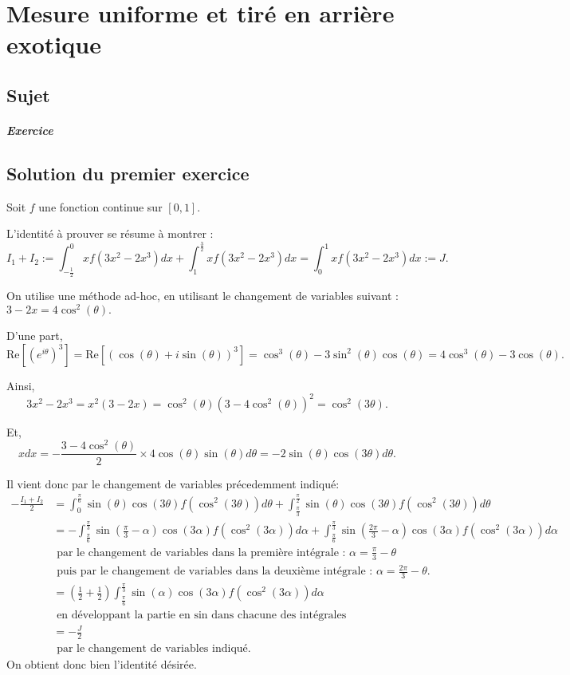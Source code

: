 \chapter{Mesure uniforme et tiré en arrière exotique}

\section{Sujet}

\paragraph{Exercice }

\section{Solution du premier exercice}

Soit $f$ une fonction continue sur $[0,1].$

L'identité à prouver se résume à montrer : $$I_{1}+I_{2}:=\int_{-\frac{1}{2}}^{0}xf(3x^{2}-2x^{3})dx+\int_{1}^{\frac{3}{2}}xf(3x^{2}-2x^{3})dx=\int_{0}^{1}xf(3x^{2}-2x^{3})dx:=J.$$

On utilise une méthode ad-hoc, en utilisant le changement de variables suivant : $3-2x=4\cos^{2}(\theta).$

D'une part, $$\mbox{Re}[(e^{i\theta})^{3}]=\mbox{Re}[\left(\cos(\theta)+i\sin(\theta)\right)^{3}]=\cos^{3}(\theta)-3\sin^{2}(\theta)\cos(\theta)=4\cos^{3}(\theta)-3\cos(\theta).$$

Ainsi, $$3x^{2}-2x^{3}=x^{2}(3-2x)=\cos^{2}(\theta)\left(3-4\cos^{2}(\theta)\right)^{2}=\cos^{2}(3\theta).$$

Et, $$xdx=-\frac{3-4\cos^{2}(\theta)}{2}\times 4\cos(\theta)\sin(\theta)d\theta=-2\sin(\theta)\cos(3\theta)d\theta.$$

Il vient donc par le changement de variables précedemment indiqué:
\begin{align*}
-\frac{I_{1}+I_{2}}{2} & = \int_{0}^{\frac{\pi}{6}}\sin(\theta)\cos(3\theta)f(\cos^{2}(3\theta))d\theta+\int_{\frac{\pi}{3}}^{\frac{\pi}{2}}\sin(\theta)\cos(3\theta)f(\cos^{2}(3\theta))d\theta\\
& =-\int_{\frac{\pi}{6}}^{\frac{\pi}{3}}\sin(\frac{\pi}{3}-\alpha)\cos(3\alpha)f(\cos^{2}(3\alpha))d\alpha+ \int_{\frac{\pi}{6}}^{\frac{\pi}{3}}\sin(\frac{2\pi}{3}-\alpha)\cos(3\alpha)f(\cos^{2}(3\alpha))d\alpha\\
& \mbox{ par le changement de variables dans la première intégrale : } \alpha=\frac{\pi}{3}-\theta\\
& \mbox{ puis par le changement de variables dans la deuxième intégrale : } \alpha=\frac{2\pi}{3}-\theta.\\
& =(\frac{1}{2}+\frac{1}{2})\int_{\frac{\pi}{6}}^{\frac{\pi}{3}}\sin(\alpha)\cos(3\alpha)f(\cos^{2}(3\alpha))d\alpha\\
& \mbox{ en développant la partie en } \sin  \mbox{ dans chacune des intégrales}\\
& = -\frac{J}{2}\\
& \mbox{ par le changement de variables indiqué. }
\end{align*}
On obtient donc bien l'identité désirée.

